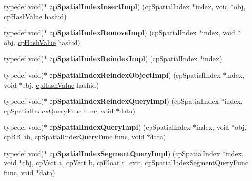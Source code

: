 \begin{DoxyCompactItemize}
\item 
\mbox{\label{group__cp_spatial_index_gab1a1e7d307a79fc97d47189bb0aea8a9}} 
typedef void($\ast$ {\bfseries cp\+Spatial\+Index\+Insert\+Impl}) (cp\+Spatial\+Index $\ast$index, void $\ast$obj, \mbox{\hyperlink{group__basic_types_gae7eb4775a9f43914a15553ca65a048f4}{cp\+Hash\+Value}} hashid)
\item 
\mbox{\label{group__cp_spatial_index_gaf943dffbd088c1f4809a254b0eb96860}} 
typedef void($\ast$ {\bfseries cp\+Spatial\+Index\+Remove\+Impl}) (cp\+Spatial\+Index $\ast$index, void $\ast$obj, \mbox{\hyperlink{group__basic_types_gae7eb4775a9f43914a15553ca65a048f4}{cp\+Hash\+Value}} hashid)
\item 
\mbox{\label{group__cp_spatial_index_gae8c6986404106d1b4717ef0a24463fe2}} 
typedef void($\ast$ {\bfseries cp\+Spatial\+Index\+Reindex\+Impl}) (cp\+Spatial\+Index $\ast$index)
\item 
\mbox{\label{group__cp_spatial_index_ga5109ec90ae7c99cf421d1b233db63900}} 
typedef void($\ast$ {\bfseries cp\+Spatial\+Index\+Reindex\+Object\+Impl}) (cp\+Spatial\+Index $\ast$index, void $\ast$obj, \mbox{\hyperlink{group__basic_types_gae7eb4775a9f43914a15553ca65a048f4}{cp\+Hash\+Value}} hashid)
\item 
\mbox{\label{group__cp_spatial_index_gad1b5f2682c09f5f4e5e48f751e8e25b6}} 
typedef void($\ast$ {\bfseries cp\+Spatial\+Index\+Reindex\+Query\+Impl}) (cp\+Spatial\+Index $\ast$index, \mbox{\hyperlink{group__cp_spatial_index_ga7bcf80d017b29d32d9f8011405b241f9}{cp\+Spatial\+Index\+Query\+Func}} func, void $\ast$data)
\item 
\mbox{\label{group__cp_spatial_index_ga15683b78b71535766a2e69d203196549}} 
typedef void($\ast$ {\bfseries cp\+Spatial\+Index\+Query\+Impl}) (cp\+Spatial\+Index $\ast$index, void $\ast$obj, \mbox{\hyperlink{structcp_b_b}{cp\+BB}} bb, \mbox{\hyperlink{group__cp_spatial_index_ga7bcf80d017b29d32d9f8011405b241f9}{cp\+Spatial\+Index\+Query\+Func}} func, void $\ast$data)
\item 
\mbox{\label{group__cp_spatial_index_gab91c6534f37f1a493c58934417b16f09}} 
typedef void($\ast$ {\bfseries cp\+Spatial\+Index\+Segment\+Query\+Impl}) (cp\+Spatial\+Index $\ast$index, void $\ast$obj, \mbox{\hyperlink{structcp_vect}{cp\+Vect}} a, \mbox{\hyperlink{structcp_vect}{cp\+Vect}} b, \mbox{\hyperlink{group__basic_types_gac1ed65573e035bf892505768c852d8d3}{cp\+Float}} t\+\_\+exit, \mbox{\hyperlink{group__cp_spatial_index_ga829ef5f6fd840ea31370d53db9045373}{cp\+Spatial\+Index\+Segment\+Query\+Func}} func, void $\ast$data)
\end{DoxyCompactItemize}
